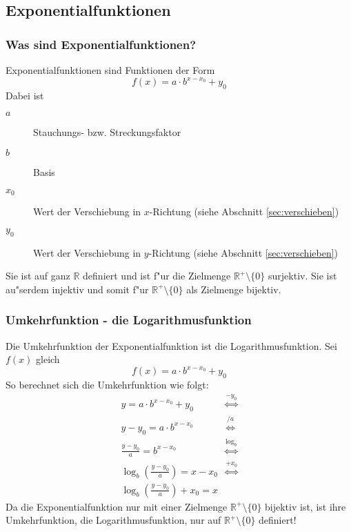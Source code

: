 \subsection{Exponentialfunktionen}
\subsubsection{Was sind Exponentialfunktionen?}
Exponentialfunktionen sind Funktionen der Form 
\begin{equation*}
f(x)=a \cdot b^{x-x_0}+y_0
\end{equation*}
Dabei ist
\begin{description}
\item[$a$] Stauchungs- bzw. Streckungsfaktor
\item[$b$] Basis
\item[$x_0$] Wert der Verschiebung in $x$-Richtung (siehe Abschnitt \ref{sec:verschieben})
\item[$y_0$] Wert der Verschiebung in $y$-Richtung (siehe Abschnitt \ref{sec:verschieben})
\end{description}
Sie ist auf ganz $\mathbb{R}$ definiert und ist f"ur die Zielmenge $\mathbb{R}^{+} \setminus \{0\}$ surjektiv. Sie ist au"serdem injektiv und somit f"ur $\mathbb{R}^{+} \setminus \{0\}$ als Zielmenge bijektiv.

\subsubsection{Umkehrfunktion - die Logarithmusfunktion}
Die Umkehrfunktion der Exponentialfunktion ist die Logarithmusfunktion. Sei $f(x)$ gleich
\begin{equation*}
f(x) = a \cdot b^{x-x_0}+y_0
\end{equation*}
So berechnet sich die Umkehrfunktion wie folgt:
\begin{align*}
y = a \cdot b^{x-x_0}+y_0 & \stackrel{-y_0}{\iff}  \\
y - y_0 = a \cdot b^{x-x_0} &\stackrel{/ a}{\iff} \\
\frac{y - y_0}{a} =  b^{x-x_0} &\stackrel{\log_b}{\iff} \\
\log_b\left(\frac{y - y_0}{a}\right) = x - x_0 &\stackrel{+x_0}{\iff} \\
\log_b\left(\frac{y - y_0}{a}\right) + x_0 = x &
\end{align*}
Da die Exponentialfunktion nur mit einer Zielmenge $\mathbb{R}^{+} \setminus \{0\}$ bijektiv ist, ist ihre Umkehrfunktion, die Logarithmusfunktion, nur auf $\mathbb{R}^{+} \setminus \{0\}$ definiert!